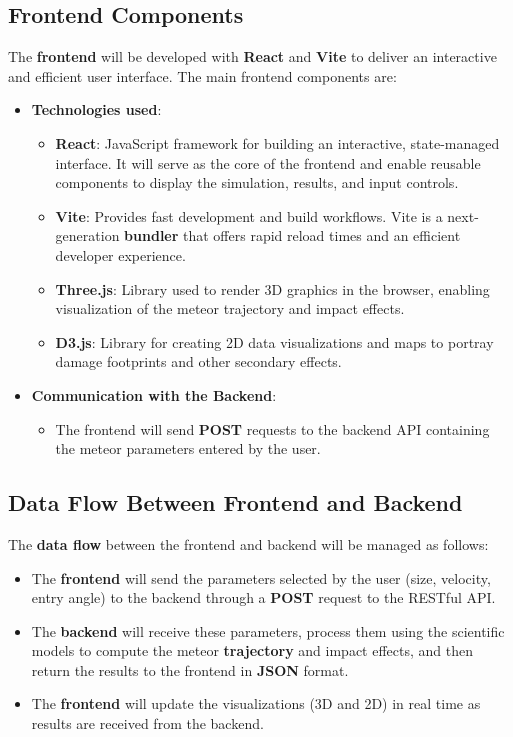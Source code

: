 \documentclass[conference]{IEEEtran}
\begin{document}
\subsection{Frontend Components}
The \textbf{frontend} will be developed with \textbf{React} and \textbf{Vite} to
deliver an interactive and efficient user interface. The main frontend
components are:
\begin{itemize}
	\item \textbf{Technologies used}:
	      \begin{itemize}
		      \item \textbf{React}: JavaScript framework for building an interactive,
		            state-managed interface. It will serve as the core of the frontend
		            and enable reusable components to display the simulation, results,
		            and input controls.
		      \item \textbf{Vite}: Provides fast development and build workflows.
		            Vite is a next-generation \textbf{bundler} that offers rapid
		            reload times and an efficient developer experience.
		      \item \textbf{Three.js}: Library used to render 3D graphics in the
		            browser, enabling visualization of the meteor trajectory and
		            impact effects.
		      \item \textbf{D3.js}: Library for creating 2D data visualizations and
		            maps to portray damage footprints and other secondary effects.
	      \end{itemize}
	\item \textbf{Communication with the Backend}:
	      \begin{itemize}
		      \item The frontend will send \textbf{POST} requests to the backend API
		            containing the meteor parameters entered by the user.
	      \end{itemize}
\end{itemize}

\subsection{Data Flow Between Frontend and Backend}
The \textbf{data flow} between the frontend and backend will be managed as
follows:
\begin{itemize}
	\item The \textbf{frontend} will send the parameters selected by the user
	      (size, velocity, entry angle) to the backend through a \textbf{POST}
	      request to the RESTful API.
	\item The \textbf{backend} will receive these parameters, process them using the
	      scientific models to compute the meteor \textbf{trajectory} and impact
	      effects, and then return the results to the frontend in \textbf{JSON}
	      format.
	\item The \textbf{frontend} will update the visualizations (3D and 2D) in real
	      time as results are received from the backend.
\end{itemize}
\end{document}
